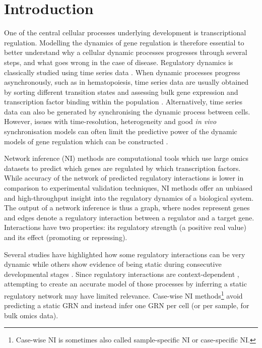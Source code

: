
\section{Introduction}

One of the central cellular processes underlying development is transcriptional regulation. 
Modelling the dynamics of gene regulation is therefore essential to better understand
why a cellular dynamic processes progresses through several steps,
and what goes wrong in the case of disease. 
Regulatory dynamics is classically studied using time series data \cite{bar-joseph_studyingmodellingdynamic_2012}. When dynamic processes progress asynchronously, such as in hematopoiesis, time series data are usually obtained by sorting different transition states and assessing bulk gene expression and transcription factor binding within the population \cite{novershtern_denselyinterconnectedtranscriptional_2011, may_dynamicanalysisgene_2013, jojic_identificationtranscriptionalregulators_2013, goode_dynamicgeneregulatory_2016}. Alternatively, time series data can also be generated by synchronising the dynamic process between cells. However, issues with time-resolution, heterogeneity and good \textit{in vivo} synchronisation models can often limit the predictive power of the dynamic models of gene regulation which can be constructed \cite{bar-joseph_studyingmodellingdynamic_2012}.

Network inference (NI) methods are computational tools which use large omics datasets to predict which genes are regulated by which transcription factors. While accuracy of the network of predicted regulatory interactions is lower in comparison to experimental validation techniques, NI methods offer an unbiased and high-throughput insight into the regulatory dynamics of a biological system.
The output of a network inference is thus a graph, where nodes represent genes and edges denote a regulatory interaction between a regulator and a target gene. Interactions have two properties: its regulatory strength (a positive real value) and its effect (promoting or repressing).

Several studies have highlighted how some regulatory interactions can be very dynamic while others show evidence of being static during consecutive developmental stages \cite{moignard_characterizationtranscriptionalnetworks_2013, pina_singlecellnetworkanalysis_2015}. 
Since regulatory interactions are context-dependent \cite{papp_genomewideanalysiscontextdependence_2005}, attempting to create an accurate model of those processes by inferring a static regulatory network may have limited relevance.
Case-wise NI methods\footnote{Case-wise NI is sometimes also called sample-specific NI or case-specific NI.} avoid predicting a static GRN and instead infer one GRN per cell (or per sample, for bulk omics data).

